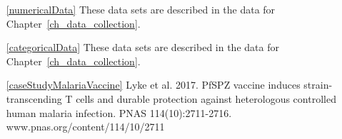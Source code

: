 \D{\newpage}


\begin{itemize}
\item[\ref{numericalData}]
    These data sets are described in
    the data for Chapter~\ref{ch_data_collection}.

\item[\ref{categoricalData}]
    These data sets are described in
    the data for Chapter~\ref{ch_data_collection}.

\item[\ref{caseStudyMalariaVaccine}]
    Lyke et al. 2017.
    PfSPZ vaccine induces strain-transcending T cells
    and durable protection against heterologous controlled
    human malaria infection.
    PNAS 114(10):2711-2716.
        {www.pnas.org/content/114/10/2711}
\end{itemize}










